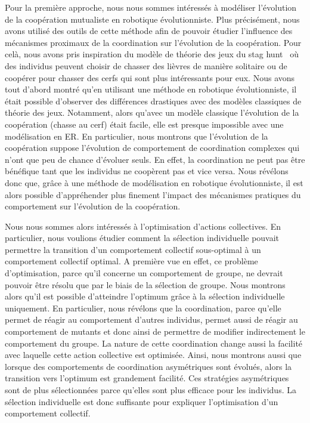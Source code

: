 		Pour la première approche, nous nous sommes intéressés à modéliser l'évolution de la coopération mutualiste en robotique évolutionniste. Plus précisément, nous avons utilisé des outils de cette méthode afin de pouvoir étudier l'influence des mécanismes proximaux de la coordination sur l'évolution de la coopération. Pour celà, nous avons pris inspiration du modèle de théorie des jeux du stag hunt~\parencite{Skyrms2004} où des individus peuvent choisir de chasser des lièvres de manière solitaire ou de coopérer pour chasser des cerfs qui sont plus intéressants pour eux. Nous avons tout d'abord montré qu'en utilisant une méthode en robotique évolutionniste, il était possible d'observer des différences drastiques avec des modèles classiques de théorie des jeux. Notamment, alors qu'avec un modèle classique l'évolution de la coopération (chasse au cerf) était facile, elle est presque impossible avec une modélisation en ER. En particulier, nous montrons que l'évolution de la coopération suppose l'évolution de comportement de coordination complexes qui n'ont que peu de chance d'évoluer seuls. En effet, la coordination ne peut pas être bénéfique tant que les individus ne coopèrent pas et vice versa. Nous révélons donc que, grâce à une méthode de modélisation en robotique évolutionniste, il est alors possible d'appréhender plus finement l'impact des mécanismes pratiques du comportement sur l'évolution de la coopération.

		Nous nous sommes alors intéressés à l'optimisation d'actions collectives. En particulier, nous voulions étudier comment la sélection individuelle pouvait permettre la transition d'un comportement collectif sous-optimal à un comportement collectif optimal. A première vue en effet, ce problème d'optimisation, parce qu'il concerne un comportement de groupe, ne devrait pouvoir être résolu que par le biais de la sélection de groupe. Nous montrons alors qu'il est possible d'atteindre l'optimum grâce à la sélection individuelle uniquement. En particulier, nous révélons que la coordination, parce qu'elle permet de réagir au comportement d'autres individus, permet aussi de réagir au comportement de mutants et donc ainsi de permettre de modifier indirectement le comportement du groupe. La nature de cette coordination change aussi la facilité avec laquelle cette action collective est optimisée. Ainsi, nous montrons aussi que lorsque des comportements de coordination asymétriques sont évolués, alors la transition vers l'optimum est grandement facilité. Ces stratégies asymétriques sont de plus sélectionnées parce qu'elles sont plus efficace pour les individus. La sélection individuelle est donc suffisante pour expliquer l'optimisation d'un comportement collectif.

